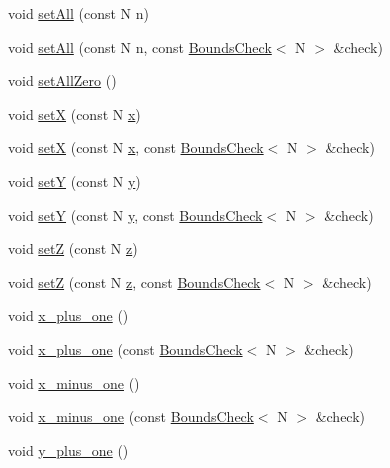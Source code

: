 \begin{DoxyCompactItemize}
\item 
void \hyperlink{struct_pos2_aef9a2916285822cc7a3c8741bd38ddf7}{set\-All} (const N n)
\item 
void \hyperlink{struct_pos2_ae08b2b8134a316cc26da0c2b96bf4f14}{set\-All} (const N n, const \hyperlink{struct_bounds_check}{Bounds\-Check}$<$ N $>$ \&check)
\item 
void \hyperlink{struct_pos2_a16c48d5f21dfe7e00c1c2cb27e0e13f0}{set\-All\-Zero} ()
\item 
void \hyperlink{struct_pos2_abbed99ee02ea50c3dc1053671b7331bb}{set\-X} (const N \hyperlink{struct_position_af908be922fc88d89d81be7d08d06f761}{x})
\item 
void \hyperlink{struct_pos2_a8ff8dc117956df7acb135c17731133ec}{set\-X} (const N \hyperlink{struct_position_af908be922fc88d89d81be7d08d06f761}{x}, const \hyperlink{struct_bounds_check}{Bounds\-Check}$<$ N $>$ \&check)
\item 
void \hyperlink{struct_pos2_a82ddb6fab8b028a52d53bb28f03b6119}{set\-Y} (const N \hyperlink{struct_position_af434f54a0aad8bbfc3806ebdd197aa3b}{y})
\item 
void \hyperlink{struct_pos2_a6ebb86ee57ab1467de7e5440d8e6358c}{set\-Y} (const N \hyperlink{struct_position_af434f54a0aad8bbfc3806ebdd197aa3b}{y}, const \hyperlink{struct_bounds_check}{Bounds\-Check}$<$ N $>$ \&check)
\item 
void \hyperlink{struct_pos2_aaa8e7d737a065e7ca846791ff31ea25c}{set\-Z} (const N \hyperlink{struct_position_ac430da98504c2d4fd685c0363d728474}{z})
\item 
void \hyperlink{struct_pos2_af5641ffd9e8b359f7f80321c5d7ddbf5}{set\-Z} (const N \hyperlink{struct_position_ac430da98504c2d4fd685c0363d728474}{z}, const \hyperlink{struct_bounds_check}{Bounds\-Check}$<$ N $>$ \&check)
\item 
void \hyperlink{struct_pos2_af1b35a8b928bea9c73c49ff384b35a4a}{x\-\_\-plus\-\_\-one} ()
\item 
void \hyperlink{struct_pos2_a95c416fe3b7b2171df1daeb36416e62a}{x\-\_\-plus\-\_\-one} (const \hyperlink{struct_bounds_check}{Bounds\-Check}$<$ N $>$ \&check)
\item 
void \hyperlink{struct_pos2_a0f132fb8ed0c2e7092614cde74ccde27}{x\-\_\-minus\-\_\-one} ()
\item 
void \hyperlink{struct_pos2_a6c0daea0c94397af825a3e943665c41a}{x\-\_\-minus\-\_\-one} (const \hyperlink{struct_bounds_check}{Bounds\-Check}$<$ N $>$ \&check)
\item 
void \hyperlink{struct_pos2_a4bd636102c60fc9e19cb91ffc8dd68bc}{y\-\_\-plus\-\_\-one} ()

\end{DoxyCompactItemize}

